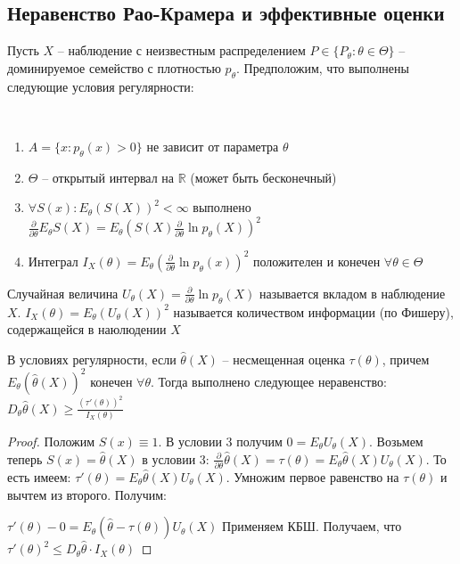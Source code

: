 \documentclass[document.tex]{subfiles}
\begin{document}
\subsection{Неравенство Рао-Крамера и эффективные оценки}
Пусть $X$ -- наблюдение с неизвестным распределением $P \in \{P_{\theta} : \theta \in \Theta\}$ -- доминируемое
семейство с плотностью $p_{\theta}$. Предположим, что выполнены следующие условия регулярности:

~\begin{enumerate}
    \item $A = \{x : p_{\theta}(x) > 0\}$ не зависит от параметра $\theta$

    \item $\Theta$ -- открытый интервал на $\mathbb{R}$ (может быть бесконечный)

    \item $\forall S(x): E_{\theta} (S(X))^2 < \infty$ выполнено $\frac{\partial}{\partial \theta} E_{\theta}S(X) =
        E_{\theta}(S(X) \frac{\partial}{\partial \theta} \ln p_{\theta}(X))^2$

    \item Интеграл $I_X(\theta) = E_{\theta} (\frac{\partial}{\partial \theta}\ln p_{\theta}(x))^2$ положителен и
        конечен $\forall \theta \in \Theta$
\end{enumerate}

\begin{definition}
    Случайная величина $U_{\theta}(X) = \frac{\partial}{\partial \theta}\ln p_{\theta}(X)$ называется вкладом в
    наблюдение $X$. $I_X(\theta) = E_{\theta}(U_{\theta}(X))^2$ называется количеством информации (по Фишеру),
    содержащейся в наюлюдении $X$
\end{definition}

\begin{theorem}
    В условиях регулярности, если $\hat \theta(X)$ -- несмещенная оценка $\tau(\theta)$, причем $E_{\theta}(\hat
    \theta(X))^2$ конечен $\forall \theta$. Тогда выполнено следующее неравенство:
    $D_{\theta}\hat \theta(X) \geq \frac{(\tau'(\theta))^2}{I_{X}(\theta)}$
\end{theorem}

\begin{proof}
    Положим $S(x) \equiv 1$. В условии 3 получим $0 = E_{\theta}U_{\theta}(X)$. Возьмем теперь $S(x) = \hat \theta(X)$ в
    условии 3: $\frac{\partial}{\partial \theta} \hat \theta(X) = \tau(\theta) = E_{\theta}\hat \theta(X)
    U_{\theta}(X)$. То есть имеем: $\tau'(\theta) = E_{\theta}\hat \theta(X) U_{\theta}(X)$. Умножим первое равенство на
    $\tau(\theta)$ и вычтем из второго. Получим:

    $\tau'(\theta) - 0 = E_{\theta}(\hat \theta - \tau(\theta))U_{\theta}(X)$ Применяем КБШ. Получаем, что 
    $\tau'(\theta)^2 \leq D_{\theta}\hat \theta \cdot I_X(\theta)$
\end{proof}
\end{document}

